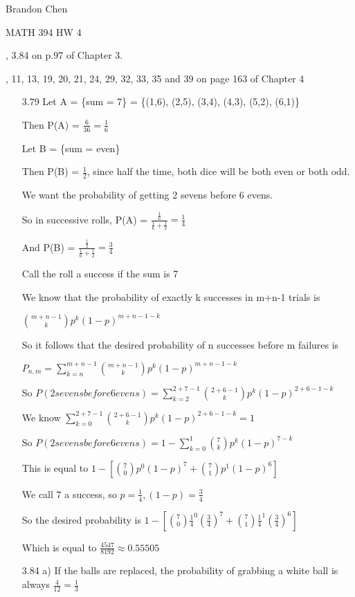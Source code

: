 \documentclass[11pt]{article}
\begin{document}
\noindent Brandon Chen

\noindent MATH 394 HW 4

, 3.84 on p.97 of Chapter 3. 

, 11, 13, 19, 20, 21, 24, 29, 32, 33, 35 and 39 on page 163 of Chapter 4


\begin{itemize}
\item[3.79]
  Let A = \{sum = 7\} = \{(1,6), (2,5), (3,4), (4,3), (5,2), (6,1)\}

  Then P(A) = $\frac{6}{36} = \frac{1}{6}$

  Let B = \{sum = even\}

  Then P(B) = $\frac{1}{2}$, since half the time, both dice will be both even or both odd.

  We want the probability of getting 2 sevens before 6 evens.

  So in successive rolls, P(A) = $\frac{\frac{1}{6}}{\frac{1}{6} + \frac{1}{2}} = \frac{1}{4}$

  And P(B) = $\frac{\frac{1}{2}}{\frac{1}{6}+\frac{1}{2}} = \frac{3}{4}$

  Call the roll a success if the sum is 7

  We know that the probability of exactly k successes in m+n-1 trials is

  $\binom{m+n-1}{k}p^k (1-p)^{m+n-1-k}$

  So it follows that the desired probability of n successes before m failures is

  $P_{n,m} = \sum_{k=n}^{m+n-1} \binom{m+n-1}{k} p^k(1-p)^{m+n-1-k}$

  So $P(2 sevens before 6 evens) = \sum_{k=2}^{2+7-1} \binom{2+6-1}{k} p^k (1-p)^{2+6-1-k}$

  We know $\sum_{k=0}^{2+7-1} \binom{2+6-1}{k} p^k (1-p)^{2+6-1-k} = 1$

  So $P(2sevensbefore6evens) = 1 - \sum_{k=0}^{1} \binom{7}{k} p^k (1-p)^{7-k}$

  This is equal to $1 - [\binom{7}{0}p^0(1-p)^{7} + \binom{7}{1} p^1 (1-p)^{6}]$

  We call 7 a success, so $p = \frac{1}{4}, (1-p) = \frac{3}{4}$

  So the desired probability is $1 - [\binom{7}{0}\frac{1}{4}^0(\frac{3}{4})^{7} + \binom{7}{1} \frac{1}{4}^1 (\frac{3}{4})^{6}]$

  Which is equal to $\frac{4547}{8192} \approx 0.55505$
\item[3.84]
  a) If the balls are replaced, the probability of grabbing a white ball is always $\frac{4}{12} = \frac{1}{3}$


\end{itemize}
\end{document}
